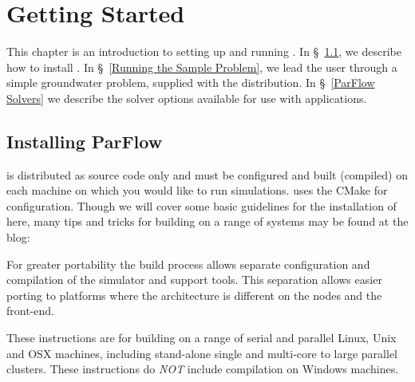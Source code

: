 
\chapter{Getting Started}
\label{Getting Started}

This chapter is an introduction to setting up and running \parflow{}.
In \S~\ref{Installing ParFlow}, we describe how to install \parflow{}.
In \S~\ref{Running the Sample Problem}, we lead the user through a
simple groundwater problem, supplied with the \parflow{} distribution. In \S~\ref{ParFlow Solvers}
we describe the solver options available for use with \parflow{} applications.


\section{Installing ParFlow}
\label{Installing ParFlow}

\parflow{} is distributed as source code only and must be configured
and built (compiled) on each machine on which you would like to run
simulations.  \parflow{} uses the CMake for configuration.  Though we
will cover some basic guidelines for the installation of \parflow{}
here, many tips and tricks for building \parflow{} on a range of
systems may be found at the \parflow{} blog:

For greater portability the \parflow{} build process allows separate
configuration and compilation of the simulator and support tools.
This separation allows easier porting to platforms where the
architecture is different on the nodes and the front-end.

These instructions are for building \parflow{} on a range of serial
and parallel Linux, Unix and OSX machines, including stand-alone
single and multi-core to large parallel clusters.  These instructions
do \emph{NOT} include compilation on Windows machines.


